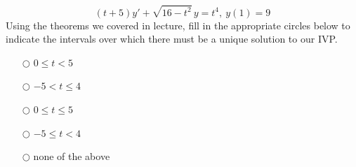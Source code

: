 \ifnum {}
$$\displaystyle (t+5)y' + \sqrt{16-t^2}\,y = t^4, \ y(1) = 9$$   
Using the theorems we covered in lecture, fill in the appropriate circles below to indicate the intervals over which there must be a unique solution to our IVP.
\begin{itemize}
    \item[$\bigcirc$] $0 \le t < 5$
    \item[$\bigcirc$] $-5 < t \le 4$
    \item[$\bigcirc$] $0 \le t \le 5$
    \item[$\bigcirc$] $-5 \le t < 4$
    \item[$\bigcirc$] none of the above
\end{itemize}
\fi 
\fi

